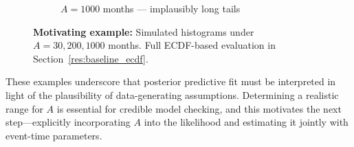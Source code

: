 \begin{example}
\begin{figure}[H]
\begin{subfigure}[t]{0.5\textwidth}
  \caption{{\small $A=1000$ months — implausibly long tails}}
  \label{fig:fake-hist_a1000}
\end{subfigure}
\caption{{\small \textbf{Motivating example:} Simulated histograms under $A=30,200,1000$ months. Full ECDF-based evaluation in Section~\ref{res:baseline_ecdf}.}}
\label{fig:ppc-A30}
\end{figure}
These examples underscore that posterior predictive fit must be interpreted in light of the plausibility of data-generating assumptions. Determining a realistic range for $A$ is essential for credible model checking, and this motivates the next step—explicitly incorporating $A$ into the likelihood and estimating it jointly with event-time parameters.
\end{example}